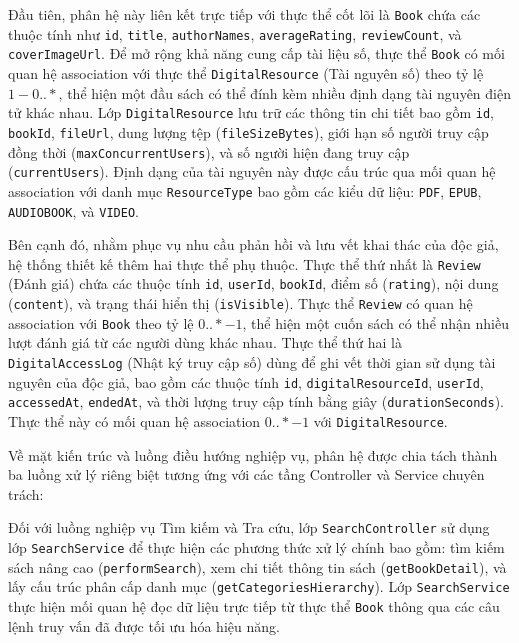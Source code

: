 Đầu tiên, phân hệ này liên kết trực tiếp với thực thể cốt lõi là \texttt{Book} chứa các thuộc tính như \texttt{id}, \texttt{title}, \texttt{authorNames}, \texttt{averageRating}, \texttt{reviewCount}, và \texttt{coverImageUrl}. Để mở rộng khả năng cung cấp tài liệu số, thực thể \texttt{Book} có mối quan hệ association với thực thể \texttt{DigitalResource} (Tài nguyên số) theo tỷ lệ $1 - 0..*$, thể hiện một đầu sách có thể đính kèm nhiều định dạng tài nguyên điện tử khác nhau. Lớp \texttt{DigitalResource} lưu trữ các thông tin chi tiết bao gồm \texttt{id}, \texttt{bookId}, \texttt{fileUrl}, dung lượng tệp (\texttt{fileSizeBytes}), giới hạn số người truy cập đồng thời (\texttt{maxConcurrentUsers}), và số người hiện đang truy cập (\texttt{currentUsers}). Định dạng của tài nguyên này được cấu trúc qua mối quan hệ association với danh mục \texttt{ResourceType} bao gồm các kiểu dữ liệu: \texttt{PDF}, \texttt{EPUB}, \texttt{AUDIOBOOK}, và \texttt{VIDEO}.

Bên cạnh đó, nhằm phục vụ nhu cầu phản hồi và lưu vết khai thác của độc giả, hệ thống thiết kế thêm hai thực thể phụ thuộc. Thực thể thứ nhất là \texttt{Review} (Đánh giá) chứa các thuộc tính \texttt{id}, \texttt{userId}, \texttt{bookId}, điểm số (\texttt{rating}), nội dung (\texttt{content}), và trạng thái hiển thị (\texttt{isVisible}). Thực thể \texttt{Review} có quan hệ association với \texttt{Book} theo tỷ lệ $0..* - 1$, thể hiện một cuốn sách có thể nhận nhiều lượt đánh giá từ các người dùng khác nhau. Thực thể thứ hai là \texttt{DigitalAccessLog} (Nhật ký truy cập số) dùng để ghi vết thời gian sử dụng tài nguyên của độc giả, bao gồm các thuộc tính \texttt{id}, \texttt{digitalResourceId}, \texttt{userId}, \texttt{accessedAt}, \texttt{endedAt}, và thời lượng truy cập tính bằng giây (\texttt{durationSeconds}). Thực thể này có mối quan hệ association $0..* - 1$ với \texttt{DigitalResource}.

Về mặt kiến trúc và luồng điều hướng nghiệp vụ, phân hệ được chia tách thành ba luồng xử lý riêng biệt tương ứng với các tầng Controller và Service chuyên trách:

Đối với luồng nghiệp vụ Tìm kiếm và Tra cứu, lớp \texttt{SearchController} sử dụng lớp \texttt{SearchService} để thực hiện các phương thức xử lý chính bao gồm: tìm kiếm sách nâng cao (\texttt{performSearch}), xem chi tiết thông tin sách (\texttt{getBookDetail}), và lấy cấu trúc phân cấp danh mục (\texttt{getCategoriesHierarchy}). Lớp \texttt{SearchService} thực hiện mối quan hệ đọc dữ liệu trực tiếp từ thực thể \texttt{Book} thông qua các câu lệnh truy vấn đã được tối ưu hóa hiệu năng.

